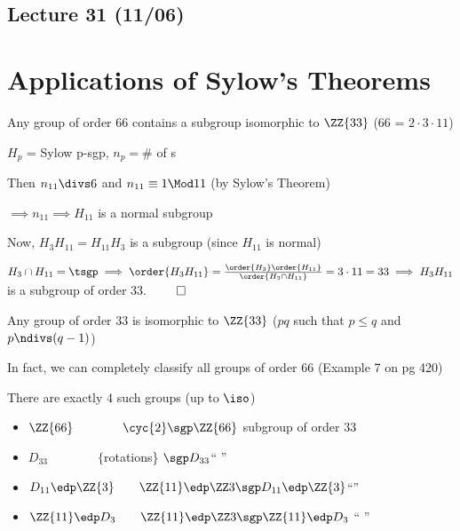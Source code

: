 \subsection*{Lecture 31 (11/06)} %
\section*{Applications of Sylow's Theorems}
\begin{example}
     Any group of order 66 contains a subgroup isomorphic to \(\ZZ{33}\) (66 = \(2\cdot 3 \cdot 11\))

     \(H_p\) = Sylow p-sgp, \(n_p = \)\# of \spsgp s

    Then \(n_{11}\divs 6\) and \(n_{11}\equiv 1\Mod 11\) (by Sylow's Theorem)

    \(\implies n_{11} \implies H_{11}\) is a normal subgroup

    Now, \(H_3H_{11} = H_{11}H_3\) is a subgroup (since \(H_{11}\) is normal)

    \(H_3\cap H_{11} = \tsgp \implies \order{H_3H_{11}}=\frac{\order{H_3}\order{H_{11}}}{\order{H_3\cap H_{11}}} = 3\cdot 11 = 33 \implies H_3H_{11}\) is a subgroup of order 33. \(\qed\)
  \end{example}
  \begin{note}
      Any group of order 33 is isomorphic to \(\ZZ{33}\) (\(pq\) such that \(p\leq q\) and \(p\ndivs (q-1)\))
  \end{note}
In fact, we can completely classify all groups of order 66 (Example 7 on pg 420)

There are exactly 4 such groups (up to \(\iso\))\begin{itemize}
    \item \(\ZZ{66}\qquad\qquad \cyc{2}\sgp \ZZ{66}\) \quad subgroup of order 33
    \item \(D_{33}\qquad\qquad \{\)rotations\} \(\sgp D_{33}\)\quad ``  \quad''
    \item \(D_{11}\edp\ZZ{3}\qquad \ZZ{11}\edp \ZZ 3 \sgp D_{11}\edp\ZZ{3}\)\quad ``\quad  ''
    \item \(\ZZ{11}\edp D_3 \qquad \ZZ{11}\edp \ZZ 3 \sgp \ZZ{11}\edp D_3\) \quad`` \quad ''
\end{itemize}

